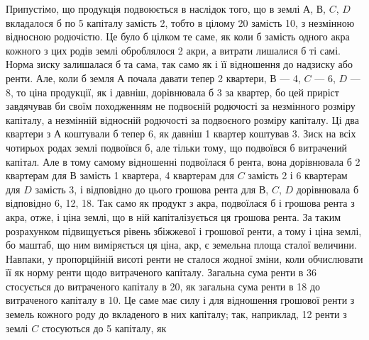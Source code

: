 Припустімо, що продукція подвоюється в наслідок того, що в землі $А$,
$В$, $C$, $D$ вкладалося б по 5 капіталу замість 2, тобто
в цілому 20 замість 10, з незмінною відносною родючістю.
Це було б цілком те саме, як коли б замість одного акра кожного з цих
родів землі оброблялося 2 акри, а витрати лишалися б ті самі. Норма зиску
залишалася б та сама, так само як і її відношення до надзиску або ренти. Але,
коли б земля $А$ почала давати тепер 2 квартери, $В$ — 4, $C$ — 6, $D$ — 8, то ціна
продукції, як і давніш, дорівнювала б 3 за квартер, бо цей приріст
завдячував би своїм походженням не подвоєній родючості за незмінного розміру
капіталу, а незмінній відносній родючості за подвоєного розміру капіталу. Ці
два квартери з $А$ коштували б тепер 6, як давніш 1 квартер коштував
3. Зиск на всіх чотирьох родах землі подвоївся б, але тільки
тому, що подвоївся б витрачений капітал. Але в тому самому відношенні подвоїлася
б рента, вона дорівнювала б 2 квартерам для $В$ замість 1 квартера, 4 квартерам
для $C$ замість 2 і 6 квартерам для $D$ замість 3, і відповідно до цього
грошова рента для $В$, $C$, $D$ дорівнювала б відповідно 6, 12, 18. Так само як продукт з акра, подвоїлася б і грошова
рента з акра, отже, і ціна землі, що в ній капіталізується ця грошова рента. За
таким розрахунком підвищується рівень збіжжевої і грошової ренти, а тому і
ціна землі, бо маштаб, що ним виміряється ця ціна, акр, є земельна площа
сталої величини. Навпаки, у пропорційній висоті ренти не сталося жодної зміни,
коли обчислювати її як норму ренти щодо витраченого капіталу. Загальна сума
ренти в 36 стосується до витраченого капіталу в 20, як загальна сума ренти
в 18 до витраченого капіталу в 10. Це саме має силу і для відношення грошової
ренти з земель кожного роду до вкладеного в них капіталу; так, наприклад,
12 ренти з землі $C$ стосуються до 5 капіталу, як
\parbreak{}  %
